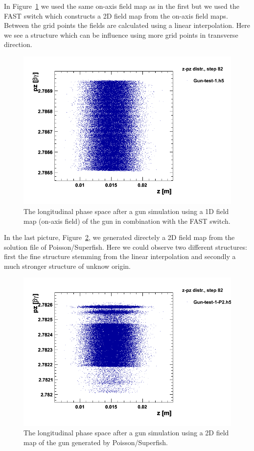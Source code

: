 In Figure~\ref{figure_1ddynamic_fast_step82} we used the same on-axis field map as in the first but we used the FAST switch which constructs a 2D field map from the on-axis field maps. Between the grid points the fields are calculated using a linear interpolation. Here we see a structure which can be influence using more grid points in transverse direction.
\begin{figure}
  \begin{center}
  \includegraphics[origin=bl,height=80mm,angle=0]{./figures/Fieldmaps/1DDynamic_fast_step82.png}
  \caption{\label{figure_1ddynamic_fast_step82}
    The longitudinal phase space after a gun simulation using a 1D field map (on-axis field) of the gun in combination with the FAST switch.
  }
  \end{center}
%
\end{figure}
In the last picture, Figure~\ref{figure_2ddynamic_step82}, we generated directely a 2D field map from the solution file of Poisson/Superfish. Here we could observe two different structures: first the fine structure stemming from the linear interpolation and secondly a much stronger structure of unknow origin.
\begin{figure}
  \begin{center}
  \includegraphics[origin=bl,height=80mm,angle=0]{./figures/Fieldmaps/2DDynamic_step82.png}
  \caption{\label{figure_2ddynamic_step82}
    The longitudinal phase space after a gun simulation using a 2D field map of the gun generated by Poisson/Superfish.
  }
  \end{center}
%
\end{figure}


